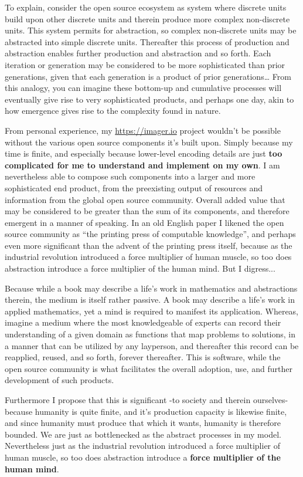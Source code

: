 To explain, consider the open source ecosystem as system where discrete units build upon other discrete units and therein produce more complex non-discrete units. This system permits for abstraction, so complex non-discrete units may be abstracted into simple discrete units. Thereafter this process of production and abstraction enables further production and abstraction and so forth. Each iteration or generation may be considered to be more sophisticated than prior generations, given that each generation is a product of prior generations… From this analogy, you can imagine these bottom-up and cumulative processes will eventually give rise to very sophisticated products, and perhaps one day, akin to how emergence gives rise to the complexity found in nature.

From personal experience, my \url{https://imager.io} project wouldn’t be possible without the various open source components it’s built upon. Simply because my time is finite, and especially because lower-level encoding details are just \textbf{too complicated for me to understand and implement on my own}. I am nevertheless able to compose such components into a larger and more sophisticated end product, from the preexisting output of resources and information from the global open source community. Overall added value that may be considered to be greater than the sum of its components, and therefore emergent in a manner of speaking. In an old English paper I likened the open source community as ``the printing press of computable knowledge'', and perhaps even more significant than the advent of the printing press itself, because as the industrial revolution introduced a force multiplier of human muscle, so too does abstraction introduce a force multiplier of the human mind. But I digress...  


Because while a book may describe a life’s work in mathematics and abstractions therein, the medium is itself rather passive. A book may describe a life’s work in applied mathematics, yet a mind is required to manifest its application. Whereas, imagine a medium where the most knowledgeable of experts can record their understanding of a given domain as functions that map problems to solutions, in a manner that can be utilized by any layperson, and thereafter this record can be reapplied, reused, and so forth, forever thereafter. This is software, while the open source community is what facilitates the overall adoption, use, and further development of such products. 

Furthermore I propose that this is significant -to society and therein ourselves- because humanity is quite finite, and it’s production capacity is likewise finite, and since humanity must produce that which it wants, humanity is therefore bounded. We are just as bottlenecked as the abstract processes in my model. Nevertheless just as the industrial revolution introduced a force multiplier of human muscle, so too does abstraction introduce a \textbf{force multiplier of the human mind}.

